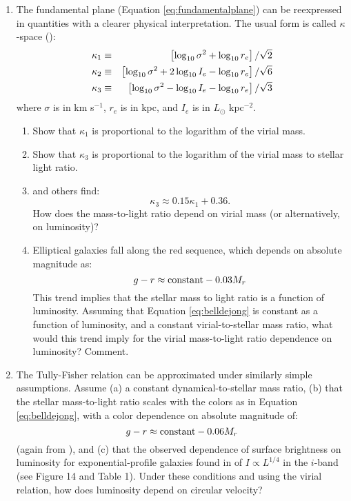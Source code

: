\begin{enumerate}
\item The fundamental plane (Equation \ref{eq:fundamentalplane}) can
be reexpressed in quantities with a clearer physical
interpretation. The usual form is called $\kappa$-space
(\citealt{bender92a}): 
\begin{eqnarray}
\kappa_1 &\equiv& \left[ \log_{10} \sigma^2 + \log_{10} r_e \right]
/ \sqrt{2} \cr
\kappa_2 &\equiv& \left[ \log_{10} \sigma^2 + 2 \log_{10} I_e
- \log_{10} r_e \right] / \sqrt{6} \cr
\kappa_3 &\equiv& \left[ \log_{10} \sigma^2 - \log_{10} I_e
- \log_{10} r_e \right] / \sqrt{3}
\end{eqnarray}
where $\sigma$ is in km s$^{-1}$, $r_e$ is in kpc, and $I_e$ is in
$L_\odot$ kpc$^{-2}$. 
\begin{enumerate}
\item Show that $\kappa_1$ is proportional to the logarithm of the
virial mass.
\item Show that $\kappa_3$ is proportional to the logarithm of the
virial mass to stellar light ratio.
\item \cite{bender92a} and others find:
\begin{equation}
\kappa_3 \approx 0.15 \kappa_1 + 0.36.
\end{equation}
How does the mass-to-light ratio depend on virial mass (or
alternatively, on luminosity)?
\item Elliptical galaxies fall along the red sequence, which depends
on absolute magnitude as:
\begin{equation}
g-r \approx {\rm constant} - 0.03 M_r
\end{equation}
This trend implies that the stellar mass to light ratio is a function
of luminosity. Assuming that Equation \ref{eq:belldejong} is constant as a
function of luminosity, and a constant virial-to-stellar mass ratio,
what would this trend imply for the virial mass-to-light ratio
dependence on luminosity? Comment.
\end{enumerate}
\item The Tully-Fisher relation can be approximated under similarly
simple assumptions. Assume (a) a constant dynamical-to-stellar mass ratio,
(b) that the stellar mass-to-light ratio scales with the colors as in
Equation \ref{eq:belldejong}, with a color dependence on absolute
magnitude of: 
\begin{equation}
g-r \approx {\rm constant} - 0.06 M_r
\end{equation}
(again from \citealt{blanton03d}), and (c) that the observed
dependence of surface brightness on luminosity for exponential-profile
galaxies found in \citet{blanton03d} of $I\propto L^{1/4}$ in the
$i$-band (see Figure 14 and Table 1). Under these conditions and using
the virial relation, how does luminosity depend on circular velocity?
\end{enumerate}

